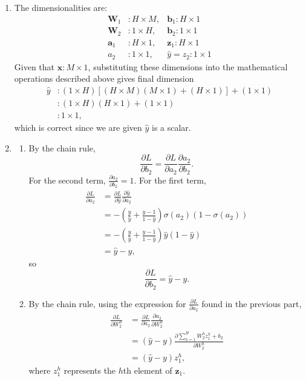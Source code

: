 \documentclass[submit]{harvardml}
\begin{document}
\begin{enumerate}
	\item The dimensionalities are:
	 \begin{align*}
	 	\mathbf{W}_1&: H \times M,
	 	&\mathbf{b}_1: H \times 1 \\
	 	\mathbf{W}_2&: 1 \times H,
	 	&\mathbf{b}_2: 1 \times 1 \\
		\mathbf{a}_1 &: H \times 1, 
		&\mathbf{z}_1 : H \times 1 \\
		a_2 &: 1 \times 1, 
		&\hat{y} = z_2 : 1 \times 1
	\end{align*}
	Given that $\mathbf{x}: M \times 1$, substituting these dimensions into the mathematical operations described above gives final dimension
	\begin{align*}
		\hat{y} &: (1 \times H)\left[(H \times M)(M \times 1) + (H \times 1)\right] + (1 \times 1) \\
		&: (1 \times H)(H \times 1) + (1 \times 1) \\
		&: 1 \times 1,
	\end{align*}
	which is correct since we are given $\hat{y}$ is a scalar.

	\item 
	\begin{enumerate}
		\item By the chain rule,
		$$\frac{\partial L}{\partial b_2} = \frac{\partial L}{\partial a_2} \frac{\partial a_2}{\partial b_2}.$$
		For the second term, $\frac{\partial{a_2}}{\partial b_2} = 1$. For the first term,
		\begin{align*}
			\frac{\partial L}{\partial a_2} &= \frac{\partial L}{\partial \hat y} \frac{\partial \hat y}{\partial a_2} \\
			&= -\left(\frac{y}{\hat y} + \frac{y - 1}{1 - \hat y}\right) \sigma(a_2)(1 - \sigma(a_2)) \\
			&= -\left(\frac{y}{\hat y} + \frac{y - 1}{1 - \hat y}\right) \hat y (1 - \hat y) \\
			&= \hat y - y,
		\end{align*}
		so
		$$\frac{\partial L}{\partial b_2} = \hat y - y.$$
		
		\item By the chain rule, using the expression for $\frac{\partial L}{\partial a_2}$ found in the previous part,
		\begin{align*}
			\frac{\partial L}{\partial W_2^h} &= \frac{\partial L}{\partial a_2} \frac{\partial a_2}{\partial W_2^h} \\
			&=(\hat y - y) \frac{\partial \sum_{h=1}^H W_2^h z_1^h + b_2}{\partial W_2^h} \\
			&= (\hat y - y) z_1^h,
		\end{align*}
		where $z_1^h$ represents the $h$th element of $\mathbf{z}_1$.
		

\end{enumerate}
\end{enumerate}
\end{document}
